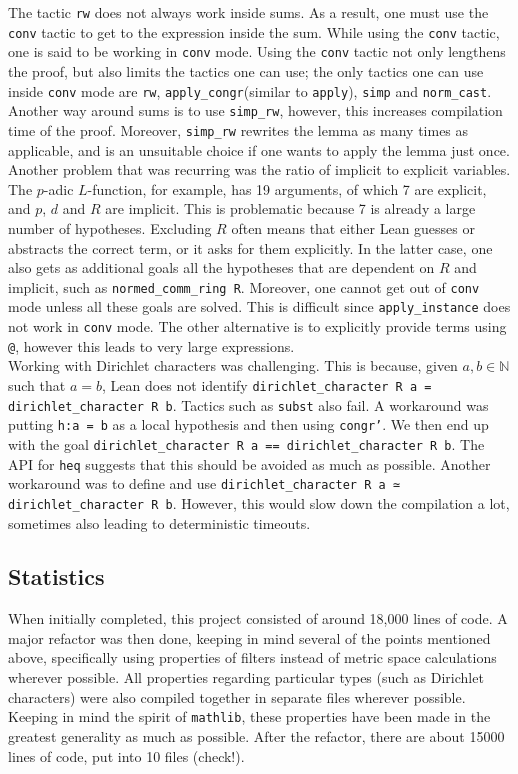 \documentclass[a4paper,UKenglish,cleveref, autoref, thm-restate]{lipics-v2021}
\newcommand{\lean}[1]{\texttt{#1}\xspace} %
\begin{document}
The tactic \lean{rw} does not always work inside sums. As a result, one must use 
the \lean{conv} tactic to get to the expression inside the sum. While using the \lean{conv} tactic, one is said to be working 
in \lean{conv} mode. Using the \lean{conv} tactic not only lengthens the proof, but also limits the tactics one can use; the 
only tactics one can use inside \lean{conv} mode are \lean{rw}, \lean{apply\_congr}(similar to \lean{apply}), \lean{simp} and 
\lean{norm\_cast}. Another way around sums is to use \lean{simp\_rw}, however, this increases compilation time of the proof. 
Moreover, \lean{simp\_rw} rewrites the lemma as many times as applicable, and is an unsuitable choice if one wants to apply 
the lemma just once. \\

Another problem that was recurring was the ratio of implicit to explicit variables. The $p$-adic $L$-function, for example, has 19 arguments, of which 7 are explicit, and $p$, 
$d$ and $R$ are implicit. This is problematic because 7 is already a large number of hypotheses. Excluding $R$ often means that either Lean guesses or abstracts the correct term, 
or it asks for them explicitly. In the latter case, one also gets as additional goals all the hypotheses that are dependent on $R$ and implicit, such as \lean{normed\_comm\_ring R}. 
Moreover, one cannot get out of \lean{conv} mode unless all these goals are solved. This is difficult since \lean{apply\_instance} does not work in \lean{conv} mode. The other 
alternative is to explicitly provide terms using \lean{@}, however this leads to very large expressions. \\

Working with Dirichlet characters was challenging. This is because, given $a, b \in \mathbb{N}$ such that $a = b$, Lean does not identify 
\lean{dirichlet\_character R a = dirichlet\_character R b}. Tactics such as \lean{subst} also fail. A workaround was putting \lean{h:a = b} as a local hypothesis and then using 
\lean{congr'}. We then end up with the goal \lean{dirichlet\_character R a == dirichlet\_character R b}. The API for \lean{heq} suggests that this should be avoided as much as possible. 
Another workaround was to define and use \lean{dirichlet\_character R a ≃ dirichlet\_character R b}. However, this would slow down the compilation a lot, sometimes also leading to 
deterministic timeouts. 

\subsection{Statistics}
When initially completed, this project consisted of around 18,000 lines of code. A major refactor was then done, keeping in mind several of the points mentioned above, specifically 
using properties of filters instead of metric space calculations wherever possible. All properties regarding particular types (such as Dirichlet characters) were also compiled together 
in separate files wherever possible. Keeping in mind the spirit of \lean{mathlib}, these properties have been made in the greatest generality as much as possible. 
After the refactor, there are about 15000 lines of code, put into 10 files (check!). \\
\end{document}
